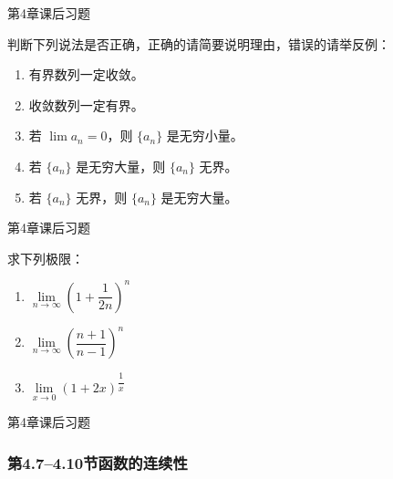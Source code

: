 \documentclass[aspectratio=169,10pt,fontset=fandol]{ctexbeamer}
\begin{document}
\begin{frame}[t,fragile]{第4章课后习题}
\normalsize
{\normalsize
判断下列说法是否正确，正确的请简要说明理由，错误的请举反例：

\begin{enumerate}

\item 有界数列一定收敛。

\item 收敛数列一定有界。

\item 若 \(\lim a_n = 0\)，则 \(\{a_n\}\) 是无穷小量。

\item 若 \(\{a_n\}\) 是无穷大量，则 \(\{a_n\}\) 无界。

\item 若 \(\{a_n\}\) 无界，则 \(\{a_n\}\) 是无穷大量。

\end{enumerate}


}
\end{frame}
\begin{frame}[t,fragile]{第4章课后习题}
\normalsize
{\normalsize
求下列极限：

\begin{enumerate}

\item \(\lim\limits_{n\to\infty} \left(1 + \dfrac{1}{2n}\right)^n\)

\item \(\lim\limits_{n\to\infty} \left(\dfrac{n+1}{n-1}\right)^n\)

\item \(\lim\limits_{x\to 0} (1 + 2x)^{\dfrac{1}{x}}\)

\end{enumerate}


}
\end{frame}
\begin{frame}[t,fragile]{第4章课后习题}
\normalsize
{\normalsize




\subsubsection*{第4.7--4.10节\quad 函数的连续性}




}
\end{frame}
\end{document}
